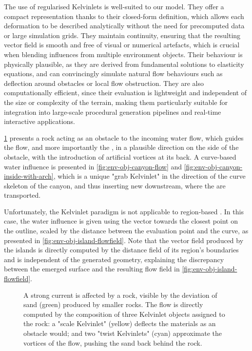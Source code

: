 The use of regularised Kelvinlets is well-suited to our model. They offer a compact representation thanks to their closed-form definition, which allows each deformation to be described analytically without the need for precomputed data or large simulation grids. They maintain continuity, ensuring that the resulting vector field is smooth and free of visual or numerical artefacts, which is crucial when blending influences from multiple environment objects. Their behaviour is physically plausible, as they are derived from fundamental solutions to elasticity equations, and can convincingly simulate natural flow behaviours such as deflection around obstacles or local flow obstruction. They are also computationally efficient, since their evaluation is lightweight and independent of the size or complexity of the terrain, making them particularly suitable for integration into large-scale procedural generation pipelines and real-time interactive applications.

\cref{fig:env-obj-rock-with-kelvinlets} presents a rock acting as an obstacle to the incoming water flow, which guides the flow, and more importantly the , in a plausible direction on the side of the obstacle, with the introduction of artificial vortices at its back. A curve-based water influence is presented in \cref{fig:env-obj-canyon-flow} and \cref{fig:env-obj-canyon-inside-with-arch}, which is a unique "grab Kelvinlet" in the direction of the curve skeleton of the canyon, and thus inserting new  downstream, where the  are transported.

Unfortunately, the Kelvinlet paradigm is not applicable to region-based . In this case, the water influence is given using the vector towards the closest point on the outline, scaled by the distance between the evaluation point and the curve, as presented in \cref{fig:env-obj-island-flowfield}. Note that the vector field produced by the islands is directly computed by the distance field of its region's boundaries and is independent of the generated geometry, explaining the discrepancy between the emerged surface and the resulting flow field in \cref{fig:env-obj-island-flowfield}.

\begin{figure}
    \caption{A strong current is affected by a rock, visible by the deviation of sand (green) produced by smaller rocks. The flow is directly computed by the composition of three Kelvinlet objects assigned to the rock: a "scale Kelvinlet" (yellow) deflects the materials as an obstacle would; and two "twist Kelvinlets" (cyan) approximate the vortices of the flow, pushing the sand back behind the rock.}
    \label{fig:env-obj-rock-with-kelvinlets}
\end{figure}

